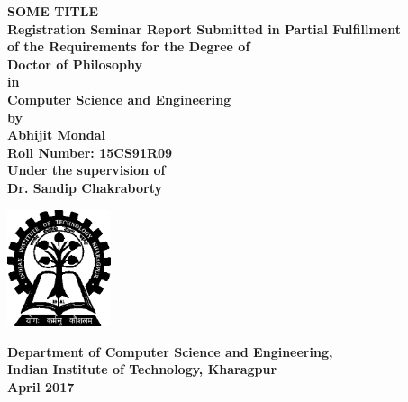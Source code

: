 \thispagestyle{empty}
\begin{titlepage}
\begin{center}
    \vspace*{0.5in}
    {\huge\textbf{SOME TITLE}} \\
    \vspace{0.6in}
     {\large\bf Registration Seminar Report Submitted in Partial Fulfillment\\ of the Requirements for the Degree of }\\
     \vspace{0.3in}
     {\large\bf Doctor of Philosophy}\\
     {\large\bf in}\\
     {\large\bf Computer Science and Engineering}\\     
    \vspace{0.5in}
    {\large\bf by}\\
    \vspace{0.3in}
    {\Large\bf Abhijit Mondal}\\
    \vspace{0.1in}
    {\Large\bf Roll Number: 15CS91R09}\\
    \vspace{0.5in}
    {\large\bf Under the supervision of}\\
    \vspace{0.2in}
    {\Large\bf  Dr. Sandip Chakraborty}\\
    \vspace{0.5in}
    \begin{center}
        \includegraphics[width=1.2in]{img/iit_logo}
    \end{center}
    {\Large\textbf{Department of Computer Science and Engineering,}}\medskip\\
    {\Large\textbf{Indian Institute of Technology, Kharagpur}}\medskip\\
    {\large\textbf{April 2017}}
\end{center}
\end{titlepage}